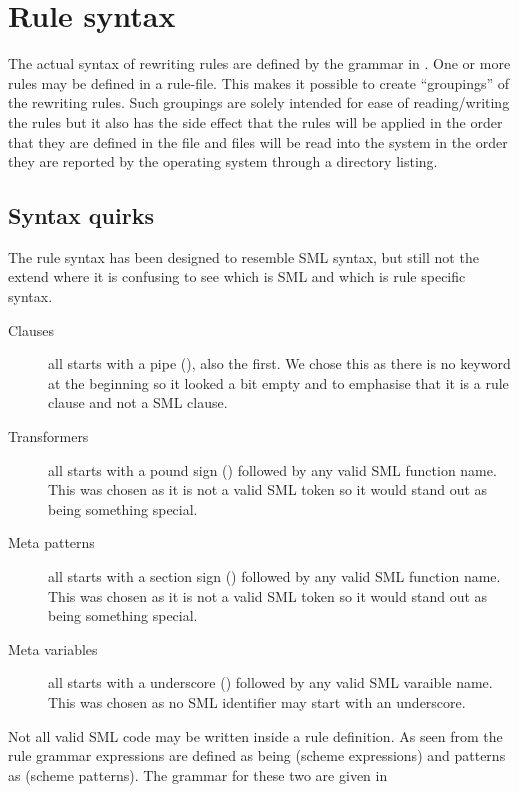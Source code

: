 \section{Rule syntax}


The actual syntax of rewriting rules are defined by the grammar in
. One or more rules may be defined in a rule-file. This
makes it possible to create ``groupings'' of the rewriting rules. Such groupings
are solely intended for ease of reading/writing the rules but it also has the
side effect that the rules will be applied in the order that they are defined in
the file and files will be read into the system in the order they are reported
by the operating system through a directory listing.

\subsection{Syntax quirks}

The rule syntax has been designed to resemble SML syntax, but still not the
extend where it is confusing to see which is SML and which is rule specific
syntax.

\begin{description}
\item[Clauses] all starts with a pipe (\ttt{|}), also the first. We chose this as
  there is no  keyword at the beginning so it looked a bit empty and to
  emphasise that it is a rule clause and not a SML clause.

\item[Transformers] all starts with a pound sign () followed by any valid
  SML function name. This was chosen as it is not a valid SML token so it would
  stand out as being something special.

\item[Meta patterns] all starts with a section sign () followed by any
  valid SML function name. This was chosen as it is not a valid SML token so it
  would stand out as being something special.

\item[Meta variables] all starts with a underscore (\ttt{\_}) followed by any
  valid SML varaible name. This was chosen as no SML identifier may start with
  an underscore.
\end{description}

Not all valid SML code may be written inside a rule definition. As seen from the
rule grammar expressions are defined as being  (scheme expressions)
and patterns as  (scheme patterns). The grammar for these two are
given in 



